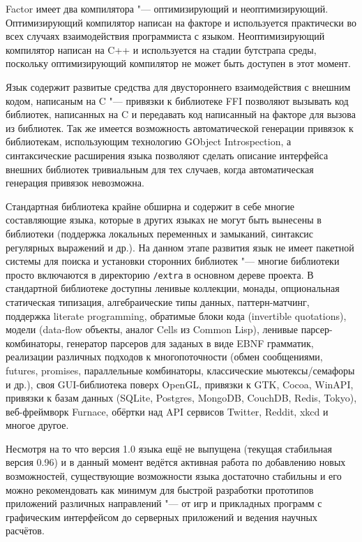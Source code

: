 \documentclass[a5paper,10pt]{article}
\begin{document}
Factor имеет два компилятора "--- оптимизирующий и
неоптимизирующий. Оптимизирующий компилятор написан на факторе и
используется практически во всех случаях взаимодействия программиста с
языком. Неоптимизирующий компилятор написан на C++ и используется на
стадии бутстрапа среды, поскольку оптимизирующий компилятор не может
быть доступен в этот момент.

Язык содержит развитые средства для двустороннего взаимодействия с
внешним кодом, написаным на C "--- привязки к библиотеке FFI позволяют
вызывать код библиотек, написанных на C и передавать код написанный на
факторе для вызова из библиотек. Так же имеется возможность
автоматической генерации привязок к библиотекам, использующим
технологию GObject Introspection, а синтаксические расширения языка
позволяют сделать описание интерфейса внешних библиотек тривиальным
для тех случаев, когда автоматическая генерация привязок невозможна.

Стандартная библиотека крайне обширна и содержит в себе многие
составляющие языка, которые в других языках не могут быть вынесены в
библиотеки (поддержка локальных переменных и замыканий, синтаксис
регулярных выражений и др.). На данном этапе развития язык не имеет
пакетной системы для поиска и установки сторонних библиотек "---
многие библиотеки просто включаются в директорию {\tt/extra} в
основном дереве проекта. В стандартной библиотеке доступны ленивые
коллекции, монады, опциональная статическая типизация, алгебраические
типы данных, паттерн-матчинг, поддержка literate programming,
обратимые блоки кода (invertible quotations), модели (data-flow
объекты, аналог Cells из Common Lisp), ленивые парсер-комбинаторы,
генератор парсеров для заданых в виде EBNF грамматик, реализации
различных подходов к многопоточности (обмен сообщениями, futures,
promises, параллельные комбинаторы, классические мьютексы/семафоры и
др.), своя GUI-библиотека поверх OpenGL, привязки к GTK, Cocoa,
WinAPI, привязки к базам данных (SQLite, Postgres, MongoDB, CouchDB,
Redis, Tokyo), веб-фреймворк Furnace, обёртки над API сервисов
Twitter, Reddit, xkcd и многое другое.

Несмотря на то что версия 1.0 языка ещё не выпущена (текущая
стабильная версия 0.96) и в данный момент ведётся активная работа по
добавлению новых возможностей, существующие возможности языка
достаточно стабильны и его можно рекомендовать как минимум для быстрой
разработки прототипов приложений различных направлений "--- от игр и
прикладных программ с графическим интерфейсом до серверных приложений
и ведения научных расчётов.

\nocite{pestov2010}
\nocite{HerzbergR09}

\end{document}
